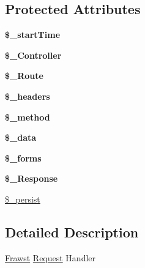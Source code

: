 \subsection*{Protected Attributes}
\begin{DoxyCompactItemize}
\item 
\hypertarget{classRequest_a79c93bbc226b36f8f59c3b856eb72120}{
{\bfseries \$\_\-startTime}}
\label{classRequest_a79c93bbc226b36f8f59c3b856eb72120}

\item 
\hypertarget{classRequest_ad6193d720d21be89331319dd09985c58}{
{\bfseries \$\_\-Controller}}
\label{classRequest_ad6193d720d21be89331319dd09985c58}

\item 
\hypertarget{classRequest_a81f4270e02a1a9243c32b4fb37b360a7}{
{\bfseries \$\_\-Route}}
\label{classRequest_a81f4270e02a1a9243c32b4fb37b360a7}

\item 
\hypertarget{classRequest_a52b9fd804e2fd8038f325fa7601274d2}{
{\bfseries \$\_\-headers}}
\label{classRequest_a52b9fd804e2fd8038f325fa7601274d2}

\item 
\hypertarget{classRequest_a2555f1eb5ec20322e0032fe1d0359687}{
{\bfseries \$\_\-method}}
\label{classRequest_a2555f1eb5ec20322e0032fe1d0359687}

\item 
\hypertarget{classRequest_aad7894a284ec13d0c720a9c18db06151}{
{\bfseries \$\_\-data}}
\label{classRequest_aad7894a284ec13d0c720a9c18db06151}

\item 
\hypertarget{classRequest_a0cc84b743e8fb2ecb8860028f12a0cb7}{
{\bfseries \$\_\-forms}}
\label{classRequest_a0cc84b743e8fb2ecb8860028f12a0cb7}

\item 
\hypertarget{classRequest_aa885eff8edc7e0361676bff6528915f6}{
{\bfseries \$\_\-Response}}
\label{classRequest_aa885eff8edc7e0361676bff6528915f6}

\item 
\hyperlink{classRequest_a6529301fb8d03a3724f00c0f625accce}{\$\_\-persist}
\end{DoxyCompactItemize}


\subsection{Detailed Description}
\hyperlink{classFrawst}{Frawst} \hyperlink{classRequest}{Request} Handler

